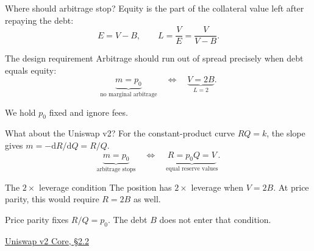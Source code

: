 \documentclass[aspectratio=169,11pt]{beamer}
\begin{document}
\begin{frame}{Where should arbitrage stop?}
  Equity is the part of the collateral value left after repaying the debt:
  \begin{equation}\label{eq:leverage-definition}
    E=V-B,\qquad L=\frac{V}{E}=\frac{V}{V-B}.
  \end{equation}
  \begin{block}{The design requirement}
    Arbitrage should run out of spread precisely when debt equals equity:
    \begin{equation}\label{eq:design-target}
      \underbrace{m=p_0}_{\text{no marginal arbitrage}}
      \quad\Longleftrightarrow\quad
      \underbrace{V=2B}_{L=2}.
    \end{equation}
  \end{block}
  We hold $p_0$ fixed and ignore fees.
\end{frame}

\begin{frame}{What about the Uniswap v2?}
  For the constant-product curve $RQ=k$, the slope gives $m=-\mathrm dR/\mathrm dQ=R/Q$.
  \begin{equation}\label{eq:unshifted-parity}
    \underbrace{m=p_0}_{\text{arbitrage stops}}
    \quad\Longleftrightarrow\quad
    \underbrace{R=p_0Q=V}_{\text{equal reserve values}}.
  \end{equation}

  \begin{block}{The $2\times$ leverage condition}
    The position has $2\times$ leverage when $V=2B$.
    At price parity, this would require $R=2B$ as well.
  \end{block}

  Price parity fixes $R/Q=p_0$. The debt $B$ does not enter that condition.

  \medskip
  {\scriptsize\href{https://app.uniswap.org/whitepaper.pdf}{Uniswap v2 Core, \S2.2}}
\end{frame}
\end{document}
